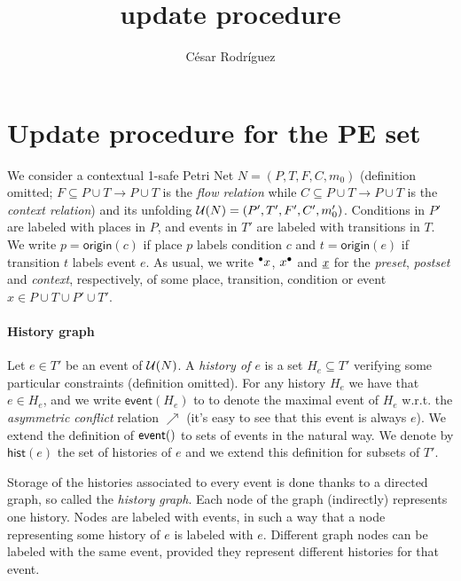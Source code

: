 \documentclass[]{article}
\title{\pe{} update procedure}
\author{César Rodríguez}
\newcommand{\event}[1]{\ensuremath{\mathsf{event}(#1)}}
\newcommand{\hist}[1]{\ensuremath{\mathsf{hist}(#1)}}
\newcommand{\origin}[1]{\ensuremath{\mathsf{origin}(#1)}}
\newcommand{\pe}{{\sc PE}}
\begin{document}
\maketitle

\section{Update procedure for the \pe{} set}

We consider a contextual 1-safe Petri Net $N = (P, T, F, C, m_0)$ (definition
omitted; $F \subseteq P \cup T \rightarrow P \cup T$ is the \emph{flow
relation} while $C \subseteq P \cup T \rightarrow P \cup T$ is the
\emph{context relation}) and its unfolding $\mathcal{U}(N) = (P', T', F', C', m_0')$.
Conditions in $P'$ are labeled with places in $P$, and events in $T'$ are
labeled with transitions in $T$.  We write $p = \origin{c}$ if place $p$ labels
condition $c$ and $t = \origin{e}$ if transition $t$ labels event $e$.  As
usual, we write ${}^\bullet x$, $x^\bullet$ and $\underline{x}$ for the \emph{preset},
\emph{postset} and \emph{context}, respectively, of some place, transition,
condition or event $x \in P \cup T \cup P' \cup T'$.

\paragraph{History graph} Let $e \in T'$ be an event of $\mathcal{U}(N)$.  A
\emph{history of $e$} is a set $H_e \subseteq T'$ verifying some particular
constraints (definition omitted).  For any history $H_e$ we have that $e \in
H_e$, and we write $\event{H_e}$ to to denote the maximal event of $H_e$ w.r.t.
the \emph{asymmetric conflict} relation $\nearrow$ (it's easy to see that this
event is always $e$).  We extend the definition of $\event$ to sets of events
in the natural way.  We denote by $\hist{e}$ the set of histories of $e$ and we
extend this definition for subsets of $T'$.

Storage of the histories associated to every event is done thanks to a directed
graph, so called the \emph{history graph}.  Each node of the graph (indirectly)
represents one history.  Nodes are labeled with events, in such a way that a
node representing some history of $e$ is labeled with $e$.  Different graph
nodes can be labeled with the same event, provided they represent different
histories for that event.
\end{document}
